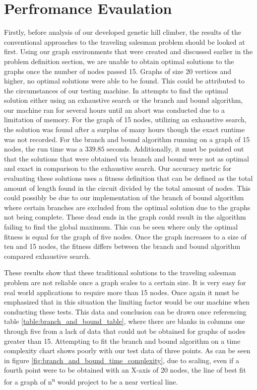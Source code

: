 \documentclass[sigplan,screen]{acmart}
\begin{document}
\section{Perfromance Evaulation}
Firstly, before analysis of our developed genetic hill climber, the results of
the conventional approaches to the traveling salesman problem should be looked
at first. Using our graph environments that were created and discussed earlier
in the problem definition section, we are unable to obtain optimal solutions to
the graphs once the number of nodes passed 15. Graphs of size 20 vertices and
higher, no optimal solutions were able to be found. This could be attributed to
the circumstances of our testing machine. In attempts to find the optimal
solution either using an exhaustive search or the branch and bound algorithm,
our machine ran for several hours until an abort was conducted due to a
limitation of memory. For the graph of 15 nodes, utilizing an exhaustive search,
the solution was found after a surplus of many hours though the exact runtime
was not recorded. For the branch and bound algorithm running on a graph of 15
nodes, the run time was a $339.85$ seconds. Additionally, it must be pointed out
that the solutions that were obtained via branch and bound were not as optimal
and exact in comparison to the exhaustive search. Our accuracy metric for
evaluating these solutions uses a fitness definition that can be defined as the
total amount of length found in the circuit divided by the total amount of
nodes. This could possibly be due to our implementation of the branch of bound
algorithm where certain branches are excluded from the optimal solution due to
the graphs not being complete. These dead ends in the graph could result in the
algorithm failing to find the global maximum. This can be seen where only the
optimal fitness is equal for the graph of five nodes. Once the graph increases
to a size of ten and 15 nodes, the fitness differs between the branch and bound
algorithm compared exhaustive search.

These results show that these traditional solutions to the traveling salesman
problem are not reliable once a graph scales to a certain size. It is very easy
for real world applications to require more than 15 nodes. Once again it must be
emphasized that in this situation the limiting factor would be our machine when
conducting these tests. This data and conclusion can be drawn once referencing
table \ref{table:branch_and_bound_table}, where there are blanks in columns one
through five from a lack of data that could not be obtained for graphs of nodes
greater than 15. Attempting to fit the branch and bound algorithm on a time
complexity chart shows poorly with our test data of three points. As can be
seen in figure \ref{fig:branch_and_bound_time_complexity}, due to scaling, even
if a fourth point were to be obtained with an X-axis of 20 nodes, the line of
best fit for a graph of n\textsuperscript{n} would project to be a near vertical
line.
\end{document}
